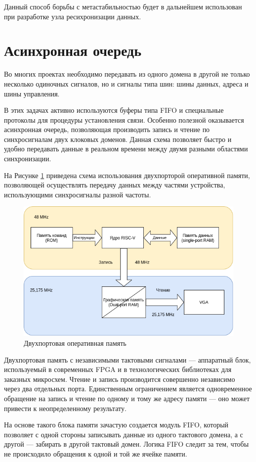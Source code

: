 Данный способ борьбы с метастабильностью будет в дальнейшем использован при разработке узла ресихронизации данных.

\section{Асинхронная очередь}

Во многих проектах необходимо передавать из одного домена в другой не только несколько одиночных сигналов, но и сигналы типа шин: шины данных, адреса и шины управления.

В этих задачах активно используются буферы типа FIFO и специальные протоколы для процедуры установления связи. Особенно полезной оказывается асинхронная очередь, позволяющая производить запись и чтение по синхросигналам двух клоковых доменов.
Данная схема позволяет быстро и удобно передавать данные в реальном времени между двумя разными областями синхронизации.

На Рисунке \ref{fig:async-fifo} приведена схема использования двухпорторой оперативной памяти, позволяющей осуществлять передачу данных между частями устройства, использующими синхросигналы разной частоты.

\begin{figure}[h!]
	\centering
	\includegraphics[width=0.65\linewidth]{course-scheme/images/dual-port-ram}
	\caption{Двухпортовая оперативная память}
	\label{fig:async-fifo}
\end{figure}

Двухпортовая память с независимыми тактовыми сигналами --- аппаратный блок, используемый в современных FPGA и в технологических библиотеках для заказных микросхем. Чтение и запись производится совершенно независимо через два отдельных порта. Единственным ограничением является одновременное обращение на запись и чтение по одному и тому же адресу памяти --- оно может привести к неопределенному результату. 

На основе такого блока памяти зачастую создается модуль FIFO, который позволяет с одной стороны записывать данные из одного тактового домена, а с другой — забирать в другой тактовый домен. Логика FIFO следит за тем, чтобы не происходило обращения к одной и той же ячейке памяти.

